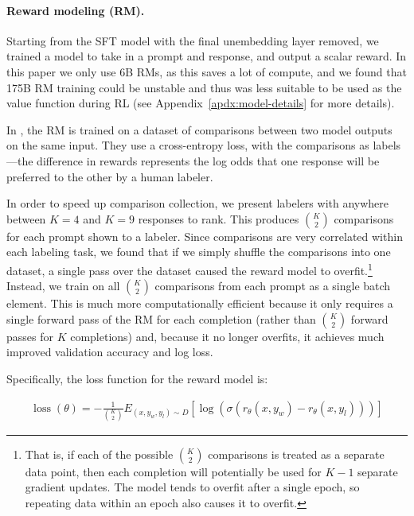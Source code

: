 \paragraph{Reward modeling (RM).} Starting from the SFT model with the final unembedding layer
removed, we trained a model to take in a prompt and response, and output
a scalar reward. In this paper we only use 6B RMs, as this saves a lot of compute, and we found that 175B RM training could be unstable and thus was less suitable to be used as the value function during RL (see Appendix~\ref{apdx:model-details} for more details). 

In \citet{stiennon2020learning}, the RM is trained on a dataset of comparisons between two model outputs on the same input. They use a cross-entropy loss, with the comparisons as labels---the difference in rewards represents the log odds that one response will be preferred to the other by a human labeler.  

In order to speed up comparison collection, we present labelers with anywhere between $K=4$ and $K=9$ responses to rank.  This produces ${K \choose 2}$ comparisons for each prompt shown to a labeler.  Since comparisons are very correlated within each labeling task, we found that if we simply shuffle the comparisons into one dataset, a single pass over the dataset caused the reward model to overfit.\footnote{That is, if each of the possible ${K \choose 2}$ comparisons is treated as a separate data point, then each completion will potentially be used for $K-1$ separate gradient updates. The model tends to overfit after a single epoch, so repeating data within an epoch also causes it to overfit.}
Instead, we train on all ${K \choose 2}$ comparisons from each prompt as a single batch element.  This is much more computationally efficient because it only requires a single forward pass of the RM for each completion (rather than ${K \choose 2}$ forward passes for $K$ completions) and, because it no longer overfits, it achieves much improved validation accuracy and log loss.

Specifically, the loss function for the reward model is:

\begin{equation} \label{eq1}
\begin{split}
\operatorname{loss}\left(\theta \right)=-\frac{1}{{K \choose 2}}E_{\left(x, y_{w}, y_{l}\right) \sim D}\left[\log \left(\sigma\left(r_{\theta}\left(x, y_{w}\right)-r_{\theta}\left(x, y_{l}\right)\right)\right)\right]
\end{split}
\end{equation}

